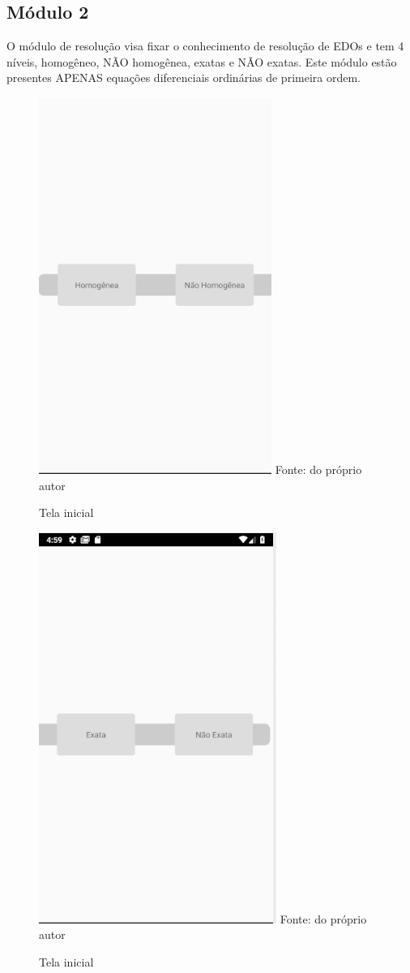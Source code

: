 \subsection[Módulo 2]{Módulo 2}

O módulo de resolução visa fixar o conhecimento de resolução de EDOs e tem 4 níveis, homogêneo, NÃO homogênea, exatas e NÃO exatas. Este módulo estão presentes APENAS equações diferenciais ordinárias de primeira ordem. 

\begin{figure}[H]
\centering
\caption{Tela inicial}
\includegraphics[scale=0.72]{figuras/modo_resolucao_1.png}
\small{Fonte: do próprio autor}
\end{figure}

\begin{figure}[H]
\centering
\caption{Tela inicial}
\includegraphics[scale=0.72]{figuras/modo_resolucao_2.png}
\small{Fonte: do próprio autor}
\end{figure}


